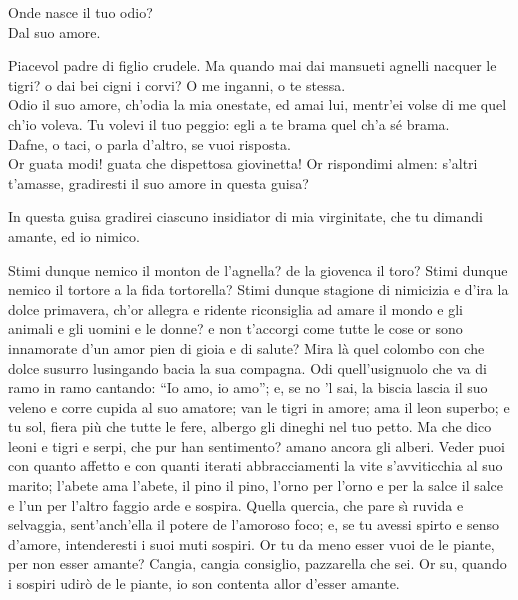 \documentclass{book}
\begin{document}
	\2 Onde nasce il tuo odio? \\

   \3 Dal suo amore.

	\2 Piacevol padre di figlio crudele.
	Ma quando mai dai mansueti agnelli
	nacquer le tigri? o dai bei cigni i corvi?
	O me inganni, o te stessa. \\

   \3 Odio il suo amore,
	ch'odia la mia onestate, ed amai lui,
	mentr'ei volse di me quel ch'io voleva.
	\2 Tu volevi il tuo peggio: egli a te brama
	quel ch'a s\'e brama. \\

   \3 Dafne, o taci, o parla
	d'altro, se vuoi risposta. \\

   \2 Or guata modi!
	guata che dispettosa giovinetta!
	Or rispondimi almen: s'altri t'amasse,
	gradiresti il suo amore in questa guisa?

	\3 In questa guisa gradirei ciascuno
	insidiator di mia virginitate,
	che tu dimandi amante, ed io nimico.

	\2 Stimi dunque nemico
	il monton de l'agnella?
	de la giovenca il toro?
	Stimi dunque nemico
	il tortore a la fida tortorella?
	Stimi dunque stagione
	di nimicizia e d'ira
	la dolce primavera,
	ch'or allegra e ridente
	riconsiglia ad amare
	il mondo e gli animali
	e gli uomini e le donne? e non t'accorgi
	come tutte le cose
	or sono innamorate
	d'un amor pien di gioia e di salute?
	Mira l\`a quel colombo
	con che dolce susurro lusingando
	bacia la sua compagna.
	Odi quell'usignuolo
	che va di ramo in ramo
	cantando: ``Io amo, io amo''; e, se no 'l sai,
	la biscia lascia il suo veleno e corre
	cupida al suo amatore;
	van le tigri in amore;
	ama il leon superbo; e tu sol, fiera
	pi\`u che tutte le fere,
	albergo gli dineghi nel tuo petto.
	Ma che dico leoni e tigri e serpi,
	che pur han sentimento? amano ancora
	gli alberi. Veder puoi con quanto affetto
	e con quanti iterati abbracciamenti
	la vite s'avviticchia al suo marito;
	l'abete ama l'abete, il pino il pino,
	l'orno per l'orno e per la salce il salce
	e l'un per l'altro faggio arde e sospira.
	Quella quercia, che pare
	s\`{\i} ruvida e selvaggia,
	sent'anch'ella il potere
	de l'amoroso foco; e, se tu avessi
	spirto e senso d'amore, intenderesti
	i suoi muti sospiri. Or tu da meno
	esser vuoi de le piante,
	per non esser amante?
	Cangia, cangia consiglio,
	pazzarella che sei.
\newpage
	\3 Or su, quando i sospiri
	udir\`o de le piante,
	io son contenta allor d'esser amante.
\end{document}
